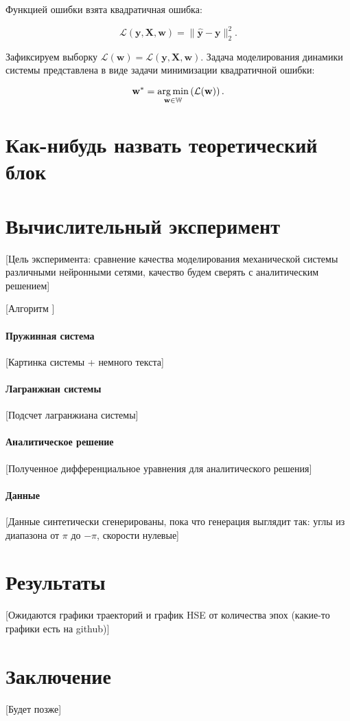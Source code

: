 \documentclass[12pt, twoside]{article}
\begin{document}
    Функцией ошибки взята квадратичная ошибка:

    $$\mathcal{L}(\mathbf{y}, \mathbf{X}, \mathbf{w}) = \| \hat{\mathbf{y}} - \mathbf{y} \|_2^2.$$

    Зафиксируем выборку $\mathcal{L}(\textbf{w}) = \mathcal{L}(\mathbf{y}, \mathbf{X}, \mathbf{w})$. Задача моделирования динамики системы представлена в виде задачи минимизации квадратичной ошибки: 

    $$\textbf{w}^* = \argmin_{\mathbf{w}\in\mathbb{W} }\left(\mathcal{L}(\textbf{w})\right).$$

\section{Как-нибудь назвать теоретический блок}

\section{Вычислительный эксперимент}

[Цель эксперимента: сравнение качества моделирования механической системы различными нейронными сетями, качество будем сверять с аналитическим решением]

[Алгоритм ]

\paragraph{Пружинная система}

[Картинка системы + немного текста]

\paragraph{Лагранжиан системы}

[Подсчет лагранжиана системы]

\paragraph{Аналитическое решение}

[Полученное дифференциальное уравнения для аналитического решения]

\paragraph{Данные}

[Данные синтетически сгенерированы, пока что генерация выглядит так: углы из диапазона от $\pi$ до $-\pi$, скорости нулевые]

\section{Результаты}

[Ожидаются графики траекторий и график HSE от количества эпох (какие-то графики есть на github)]

\section{Заключение}

[Будет позже]



\end{document}
